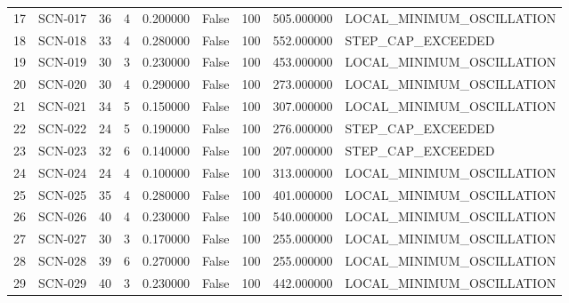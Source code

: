 \begin{table}[htbp]
\begin{tabular}{rlrrrrrrl}
17 & SCN-017 & 36 & 4 & 0.200000 & False & 100 & 505.000000 & LOCAL\_MINIMUM\_OSCILLATION \\
18 & SCN-018 & 33 & 4 & 0.280000 & False & 100 & 552.000000 & STEP\_CAP\_EXCEEDED \\
19 & SCN-019 & 30 & 3 & 0.230000 & False & 100 & 453.000000 & LOCAL\_MINIMUM\_OSCILLATION \\
20 & SCN-020 & 30 & 4 & 0.290000 & False & 100 & 273.000000 & LOCAL\_MINIMUM\_OSCILLATION \\
21 & SCN-021 & 34 & 5 & 0.150000 & False & 100 & 307.000000 & LOCAL\_MINIMUM\_OSCILLATION \\
22 & SCN-022 & 24 & 5 & 0.190000 & False & 100 & 276.000000 & STEP\_CAP\_EXCEEDED \\
23 & SCN-023 & 32 & 6 & 0.140000 & False & 100 & 207.000000 & STEP\_CAP\_EXCEEDED \\
24 & SCN-024 & 24 & 4 & 0.100000 & False & 100 & 313.000000 & LOCAL\_MINIMUM\_OSCILLATION \\
25 & SCN-025 & 35 & 4 & 0.280000 & False & 100 & 401.000000 & LOCAL\_MINIMUM\_OSCILLATION \\
26 & SCN-026 & 40 & 4 & 0.230000 & False & 100 & 540.000000 & LOCAL\_MINIMUM\_OSCILLATION \\
27 & SCN-027 & 30 & 3 & 0.170000 & False & 100 & 255.000000 & LOCAL\_MINIMUM\_OSCILLATION \\
28 & SCN-028 & 39 & 6 & 0.270000 & False & 100 & 255.000000 & LOCAL\_MINIMUM\_OSCILLATION \\
29 & SCN-029 & 40 & 3 & 0.230000 & False & 100 & 442.000000 & LOCAL\_MINIMUM\_OSCILLATION \\
\bottomrule
\end{tabular}

\end{table}
